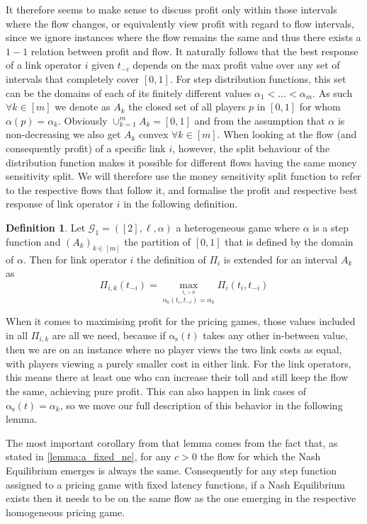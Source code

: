 \documentclass[10pt,a4paper]{book}
\newcommand{\as}{\mathrm{\alpha_s}}
\newcommand{\Gm}{\mathcal{G}}
\theoremstyle{definition}
\newtheorem{definition}{Definition}[chapter]
\theoremstyle{comment}
\begin{document}
It therefore seems to make sense to discuss profit only within those intervals where the flow changes, or equivalently view profit with regard to flow intervals, since we ignore instances where the flow remains the same and thus there exists a $1-1$ relation between profit and flow.
It naturally follows that the best response of a link operator $i$ given $t_{-i}$ depends on the max profit value over any set of intervals that completely cover $[0, 1]$.
For step distribution functions, this set can be the domains of each of its finitely different values $\alpha_1 < \ldots < \alpha_m$.
As such $\forall k \in [m]$ we denote as $A_k$ the closed set of all players $p$ in $[0, 1]$ for whom $\alpha(p) = \alpha_k$.
Obviously $\cup_{k=1}^m A_k = [0, 1]$ and from the assumption that $\alpha$ is non-decreasing we also get $A_k$ convex $\forall k \in [m]$.
When looking at the flow (and consequently profit) of a specific link $i$, however, the split behaviour of the distribution function makes it possible for different flows having the same money sensitivity split.
We will therefore use the money sensitivity split function to refer to the respective flows that follow it, and formalise the profit and respective best response of link operator $i$ in the following definition.

\begin{definition}
	Let $\Gm_1 = ([2], \ell, \alpha)$ a heterogeneous game where $\alpha$ is a step function and $(A_k)_{k \in [m]}$ the partition of $[0, 1]$ that is defined by the domain of $\alpha$.
	Then for link operator $i$ the definition of $\Pi_i$ is extended for an interval $A_k$ as
	\[
		\Pi_{i, k}(t_{-i}) = \max_{\stackrel{t_i > 0}{\as(t_i, t_{-i}) = \alpha_k}}\Pi_i(t_i, t_{-i})
	\]
\end{definition}

When it comes to maximising profit for the pricing games, those values included in all $\Pi_{i, k}$ are all we need, because if $\as(t)$ takes any other in-between value, then we are on an instance where no player views the two link costs as equal, with players viewing a purely smaller cost in either link.
For the link operators, this means there at least one who can increase their toll and still keep the flow the same, achieving pure profit.
This can also happen in link cases of $\as(t) = \alpha_k$, so we move our full description of this behavior in the following lemma.

The most important corollary from that lemma comes from the fact that, as stated in \ref{lemma:a_fixed_ne}, for any $c > 0$ the flow for which the Nash Equilibrium emerges is always the same.
Consequently for any step function assigned to a pricing game with fixed latency functions, if a Nash Equilibrium exists then it needs to be on the same flow as the one emerging in the respective homogeneous pricing game.
\end{document}
